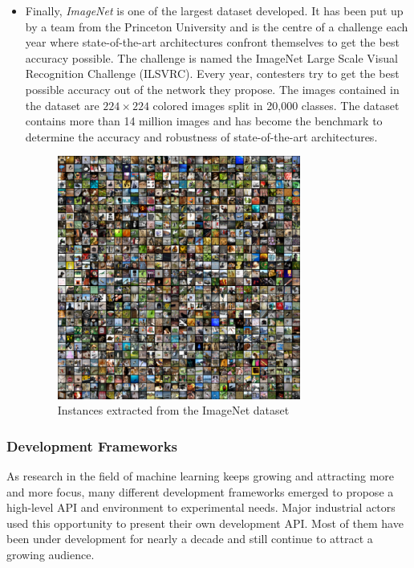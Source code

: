 \begin{itemize}
  \item Finally, \emph{ImageNet} \cite{ImageNet2009} is one of the largest dataset developed. It has been put up by a team from the Princeton University and is the centre of a challenge each year where state-of-the-art architectures confront themselves to get the best accuracy possible. The challenge is named the ImageNet Large Scale Visual Recognition Challenge (ILSVRC). Every year, contesters try to get the best possible accuracy out of the network they propose. The images contained in the dataset are $224 \times 224$ colored images split in 20,000 classes. The dataset contains more than 14 million images and has become the benchmark to determine the accuracy and robustness of state-of-the-art architectures.

  \begin{figure}[htbp]
  	\centering
  		\includegraphics[width=8cm]{Figures/ImageNet.png}
  	\caption[ImageNet]{Instances extracted from the ImageNet dataset}
  	\label{fig:ImageNet}
  \end{figure}

\end{itemize}



\subsubsection{Development Frameworks}

As research in the field of machine learning keeps growing and attracting more and more focus, many different development frameworks emerged to propose a high-level API and environment to experimental needs. Major industrial actors used this opportunity to present their own development API. Most of them have been under development for nearly a decade and still continue to attract a growing audience.

